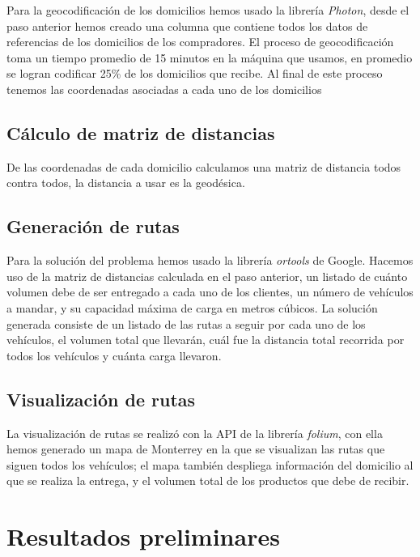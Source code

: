 \documentclass[journal]{IEEEtran}                                                          %
\begin{document}
            Para la geocodificación de los domicilios hemos usado la librería \emph{Photon}, desde el paso anterior hemos creado una columna que contiene todos los datos de referencias de los domicilios de los compradores. El proceso de geocodificación toma un tiempo promedio de 15 minutos en la máquina que usamos, en promedio se logran codificar 25\% de los domicilios que recibe. Al final de este proceso tenemos las coordenadas asociadas a cada uno de los domicilios

        \subsection{Cálculo de matriz de distancias} \label{stage 3}
            
            De las coordenadas de cada domicilio calculamos una matriz de distancia todos contra todos, la distancia a usar es la geodésica.

        \subsection{Generación de rutas} \label{stage 4}
        
            Para la solución del problema hemos usado la librería \emph{ortools} de Google. Hacemos uso de la matriz de distancias calculada en el paso anterior, un listado de cuánto volumen debe de ser entregado a cada uno de los clientes, un número de vehículos a mandar, y su capacidad máxima de carga en metros cúbicos. La solución generada consiste de un listado de las rutas a seguir por cada uno de los vehículos, el volumen total que llevarán, cuál fue la distancia total recorrida por todos los vehículos y cuánta carga llevaron.

        \subsection{Visualización de rutas} 
            
            La visualización de rutas se realizó con la API de la librería \emph{folium}, con ella hemos generado un mapa de Monterrey en la que se visualizan las rutas que siguen todos los vehículos; el mapa también despliega información del domicilio al que se realiza la entrega, y el volumen total de los productos que debe de recibir.

    \section{Resultados preliminares}
    
\end{document}
